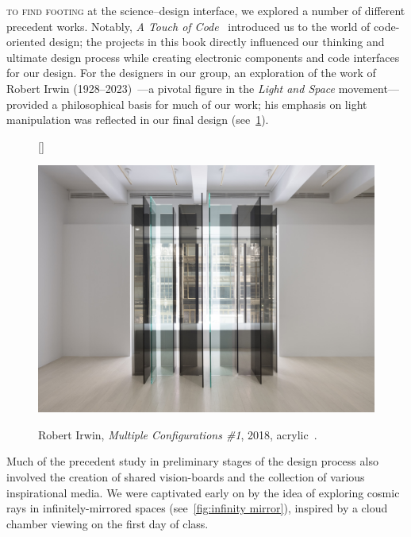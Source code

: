 \documentclass[12pt]{article}
\begin{document}
    \textsc{to find footing} at the science–design interface, we explored a number of different precedent works. Notably, \textit{A Touch of Code}~\cite{Klanten2011ATO} introduced us to the world of code-oriented design; the projects in this book directly influenced our thinking and ultimate design process while creating electronic components and code interfaces for our design. For the designers in our group, an exploration of the work of Robert Irwin (1928–2023)~\cite{weschler1982seeing}—a pivotal figure in the \textit{Light and Space} movement—provided a philosophical basis for much of our work; his emphasis on light manipulation was reflected in our final design (see~\cref{fig:irwin}). 
    \begin{figure}[h]
        [\FBwidth]
        {\caption{Robert Irwin, \textit{Multiple Configurations \#1}, 2018, acrylic~\cite{irwin2018multiple}.}\label{fig:irwin}}
        {\includegraphics[width=\linewidth]{images/irwin.png}}
    \end{figure}
    Much of the precedent study in preliminary stages of the design process also involved the creation of shared vision-boards and the collection of various inspirational media. We were captivated early on by the idea of exploring cosmic rays in infinitely-mirrored spaces (see~\cref{fig:infinity mirror}), inspired by a cloud chamber viewing on the first day of class.
    
\end{document}
